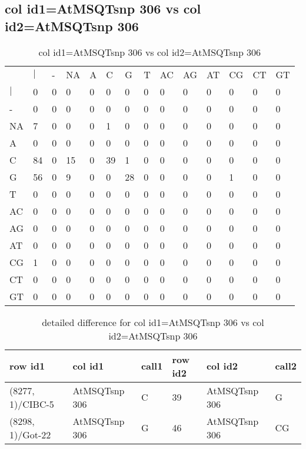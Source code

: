 \subsection{col id1=AtMSQTsnp 306 vs col id2=AtMSQTsnp 306}
\begin{center}
\begin{longtable}{|l|l|l|l|l|l|l|l|l|l|l|l|l|l|}
\caption{col id1=AtMSQTsnp 306 vs col id2=AtMSQTsnp 306} \label{table_dm642}\\
\hline
\\
\hline
&$|$&-&NA&A&C&G&T&AC&AG&AT&CG&CT&GT\\
$|$&0&0&0&0&0&0&0&0&0&0&0&0&0\\
-&0&0&0&0&0&0&0&0&0&0&0&0&0\\
NA&7&0&0&0&1&0&0&0&0&0&0&0&0\\
A&0&0&0&0&0&0&0&0&0&0&0&0&0\\
C&84&0&15&0&39&1&0&0&0&0&0&0&0\\
G&56&0&9&0&0&28&0&0&0&0&1&0&0\\
T&0&0&0&0&0&0&0&0&0&0&0&0&0\\
AC&0&0&0&0&0&0&0&0&0&0&0&0&0\\
AG&0&0&0&0&0&0&0&0&0&0&0&0&0\\
AT&0&0&0&0&0&0&0&0&0&0&0&0&0\\
CG&1&0&0&0&0&0&0&0&0&0&0&0&0\\
CT&0&0&0&0&0&0&0&0&0&0&0&0&0\\
GT&0&0&0&0&0&0&0&0&0&0&0&0&0\\
\hline
\end{longtable}
\end{center}

\begin{center}
\begin{longtable}{|l|l|l|l|l|l|}
\caption{detailed difference for col id1=AtMSQTsnp 306 vs col id2=AtMSQTsnp 306} \label{table_dm643}\\
\hline
row id1&col id1&call1&row id2&col id2&call2\\
\hline
(8277, 1)/CIBC-5&AtMSQTsnp 306&C&39&AtMSQTsnp 306&G\\
(8298, 1)/Got-22&AtMSQTsnp 306&G&46&AtMSQTsnp 306&CG\\
\hline
\end{longtable}
\end{center}

